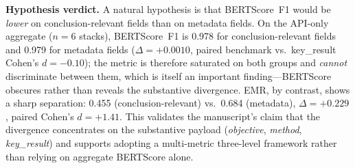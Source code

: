 \documentclass[11pt]{article}
\begin{document}
\vspace{0.5em}
\par\noindent\textbf{Hypothesis verdict.} A natural hypothesis is that BERTScore~F1 would be \emph{lower} on conclusion-relevant fields than on metadata fields. On the API-only aggregate ($n{=}6$ stacks), BERTScore~F1 is 0.978 for conclusion-relevant fields and 0.979 for metadata fields ($\Delta{=}+0.0010$, paired benchmark vs.\ key\_result Cohen's $d{=}-0.10$); the metric is therefore saturated on both groups and \emph{cannot} discriminate between them, which is itself an important finding---BERTScore obscures rather than reveals the substantive divergence. EMR, by contrast, shows a sharp separation: 0.455 (conclusion-relevant) vs.\ 0.684 (metadata), $\Delta{=}+0.229$, paired Cohen's $d{=}+1.41$. This validates the manuscript's claim that the divergence concentrates on the substantive payload (\emph{objective}, \emph{method}, \emph{key\_result}) and supports adopting a multi-metric three-level framework rather than relying on aggregate BERTScore alone.
\end{document}
